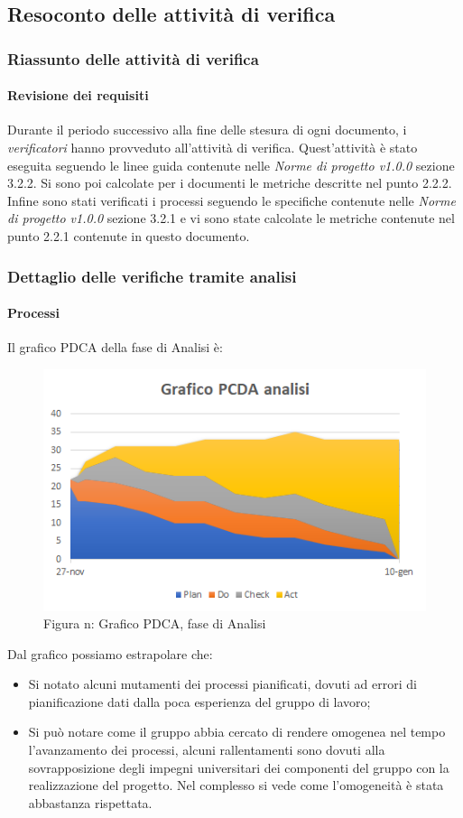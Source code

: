 \subsection{Resoconto delle attività di verifica}
\subsubsection{Riassunto delle attività di verifica}
\paragraph{Revisione dei requisiti} \Spazio
Durante il periodo successivo alla fine delle stesura di ogni documento, i \emph{verificatori}  hanno provveduto all'attività di verifica. Quest'attività è stato eseguita seguendo le linee guida contenute nelle \emph{Norme di progetto v1.0.0} sezione 3.2.2.
Si sono poi calcolate per i documenti le metriche descritte nel punto 2.2.2.
Infine sono stati verificati i processi seguendo le specifiche contenute nelle \emph{Norme di progetto v1.0.0} sezione 3.2.1 e vi sono state calcolate le metriche contenute nel punto 2.2.1 contenute in questo documento.
\subsubsection{Dettaglio delle verifiche tramite analisi}
\paragraph{Processi}
Il grafico PDCA della fase di Analisi è:
\begin{figure} [H]
	\centering
	\includegraphics[scale=1]{Img/Grafico_PDCA}
	\caption{Figura n: Grafico PDCA, fase di Analisi}\label{}
\end{figure}
Dal grafico possiamo estrapolare che:
\begin{itemize}
	\item Si notato alcuni mutamenti dei processi pianificati, dovuti ad errori di pianificazione dati dalla poca esperienza del gruppo di lavoro;
	\item Si può notare come il gruppo abbia cercato di rendere omogenea nel tempo l'avanzamento dei processi, alcuni rallentamenti sono dovuti alla sovrapposizione degli impegni
	universitari dei componenti del gruppo con la realizzazione del progetto. Nel complesso si vede come l'omogeneità è stata abbastanza rispettata.
\end{itemize}

